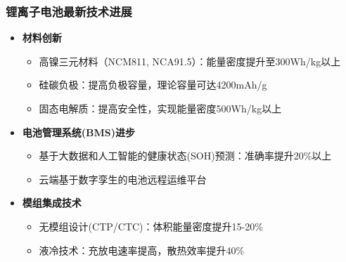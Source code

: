 \documentclass[aspectratio=169]{beamer}
\begin{document}
\begin{frame}
    \frametitle{锂离子电池最新技术进展}
    \begin{itemize}
        \item \textbf{材料创新}
        \begin{itemize}
            \item 高镍三元材料（NCM811, NCA91.5）：能量密度提升至300Wh/kg以上
            \item 硅碳负极：提高负极容量，理论容量可达4200mAh/g
            \item 固态电解质：提高安全性，实现能量密度500Wh/kg以上
        \end{itemize}
        \item \textbf{电池管理系统(BMS)进步}
        \begin{itemize}
            \item 基于大数据和人工智能的健康状态(SOH)预测：准确率提升20\%以上
            \item 云端基于数字孪生的电池远程运维平台
        \end{itemize}
        \item \textbf{模组集成技术}
        \begin{itemize}
            \item 无模组设计(CTP/CTC)：体积能量密度提升15-20\%
            \item 液冷技术：充放电速率提高，散热效率提升40\%
        \end{itemize}
    \end{itemize}
\end{frame}
\end{document}
